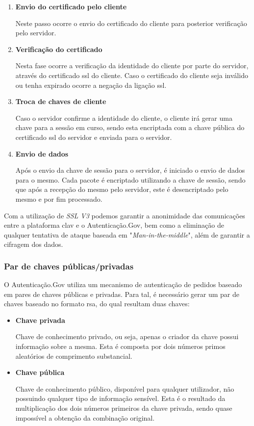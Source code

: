 \begin{enumerate}
    \item \textbf{Envio do certificado pelo cliente}
    
    Neste passo ocorre o envio do certificado do cliente para posterior verificação pelo servidor.
    
    \item \textbf{Verificação do certificado}
    
    Nesta fase ocorre a verificação da identidade do cliente por parte do servidor, através do certificado \gls{ssl} do cliente. Caso o certificado do cliente seja inválido ou tenha expirado ocorre a negação da ligação \gls{ssl}.
    
    \item \textbf{Troca de chaves de cliente}
    
    Caso o servidor confirme a identidade do cliente, o cliente irá gerar uma chave para a sessão em curso, sendo esta encriptada com a chave pública do certificado \gls{ssl} do servidor e enviada para o servidor.
    
    \item \textbf{Envio de dados}
    
    Após o envio da chave de sessão para o servidor, é iniciado o envio de dados para o mesmo. Cada pacote é encriptado utilizando a chave de sessão, sendo que após a recepção do mesmo pelo servidor, este é desencriptado pelo mesmo e por fim processado.
\end{enumerate}

Com a utilização de \emph{SSL V3} podemos garantir a anonimidade das comunicações entre a plataforma \gls{clav} e o Autenticação.Gov, bem como a eliminação de qualquer tentativa de ataque baseada em "\emph{Man-in-the-middle}", além de garantir a cifragem dos dados.

\cleardoublepage
\subsubsection{Par de chaves públicas/privadas}

O Autenticação.Gov utiliza um mecanismo de autenticação de pedidos baseado em pares de chaves públicas e privadas. Para tal, é necessário gerar um par de chaves baseado no formato \gls{rsa}, do qual resultam duas chaves:
\begin{itemize}
    \item \textbf{Chave privada}
    
    Chave de conhecimento privado, ou seja, apenas o criador da chave possui informação sobre a mesma. Esta é composta por dois números primos aleatórios de comprimento substancial.
    
    \item \textbf{Chave pública}
    
    Chave de conhecimento público, disponível para qualquer utilizador, não possuindo qualquer tipo de informação sensível. Esta é o resultado da multiplicação dos dois números primeiros da chave privada, sendo quase impossível a obtenção da combinação original.
\end{itemize}

